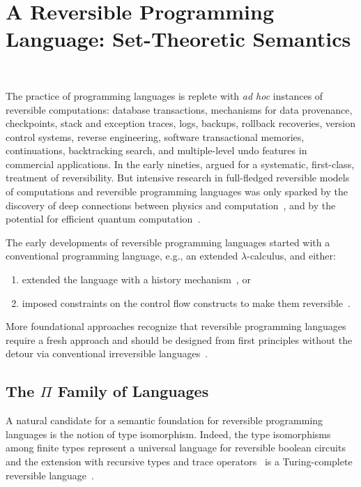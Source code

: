 \section{A Reversible Programming Language: Set-Theoretic Semantics}~\label{sec:reversibleone}

The practice of programming languages is replete with \emph{ad hoc} instances of reversible computations: database
transactions, mechanisms for data provenance, checkpoints, stack and exception traces, logs, backups, rollback
recoveries, version control systems, reverse engineering, software transactional memories, continuations, backtracking
search, and multiple-level undo features in commercial applications. In the early nineties,
\citet{Baker:1992:LLL,Baker:1992:NFT} argued for a systematic, first-class, treatment of reversibility. But intensive
research in full-fledged reversible models of computations and reversible programming languages was only sparked by the
discovery of deep connections between physics and
computation~\cite{Landauer:1961,PhysRevA.32.3266,Toffoli:1980,bennett1985fundamental,Frank:1999:REC:930275, Hey:1999:FCE:304763,fredkin1982conservative}, and by the
potential for efficient quantum computation~\cite{springerlink:10.1007/BF02650179}.

The early developments of reversible programming languages started
with a conventional programming language, e.g., an extended
$\lambda$-calculus, and either:
\begin{enumerate}
\item extended the language with a history
mechanism~\cite{vanTonder:2004,Kluge:1999:SEMCD,lorenz,danos2004reversible}, or
\item imposed constraints on the control flow constructs to make them
reversible~\cite{Yokoyama:2007:RPL:1244381.1244404}.
\end{enumerate}
More foundational approaches recognize that reversible programming languages require a fresh approach and should be
designed from first principles without the detour via conventional irreversible
languages~\cite{Yokoyama:2008:PRP,Mu:2004:ILRC,abramsky2005structural,DiPierro:2006:RCL:1166042.1166047,
  rc2011,James:2012:IE:2103656.2103667,Carette2016}.

\subsection{The $\Pi$ Family of Languages}

A natural candidate for a semantic foundation for reversible programming languages is the notion of type
isomorphism. Indeed, the type isomorphisms among finite types represent a universal language for reversible boolean
circuits~\cite{James:2012:IE:2103656.2103667} and the extension with recursive types and trace
operators~\cite{Hasegawa:1997:RCS:645893.671607} is a Turing-complete reversible
language~\cite{James:2012:IE:2103656.2103667,rc2011}.

